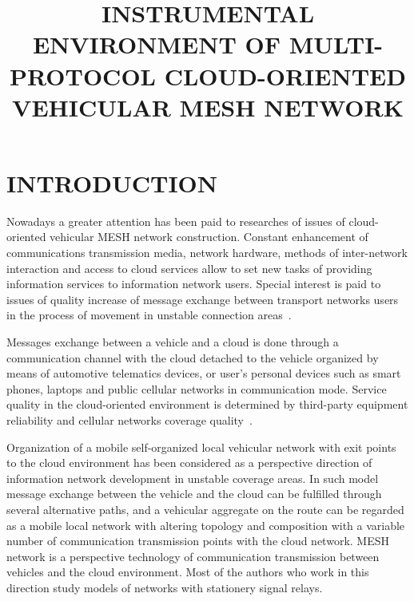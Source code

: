 \documentclass[a4paper,twoside]{article}
\begin{document}
\title{INSTRUMENTAL ENVIRONMENT OF MULTI-PROTOCOL CLOUD-ORIENTED VEHICULAR MESH NETWORK}

\author{  
}



\onecolumn \maketitle \normalsize \vfill

\section{INTRODUCTION}

Nowadays a greater attention has been paid to researches of issues of cloud-oriented vehicular MESH network construction. Constant enhancement of communications transmission media, network hardware, methods of inter-network interaction and access to cloud services allow to set new tasks of providing information services to information network users. Special interest is paid to issues of quality increase of message exchange between transport networks users in the process of movement in unstable connection areas~\cite{Zaborovsky}.

Messages exchange between a vehicle and a cloud is done through a communication channel with the cloud detached to the vehicle organized by means of automotive telematics devices, or user's personal devices such as smart phones, laptops and public cellular networks in communication mode. Service quality in the cloud-oriented environment is determined by third-party equipment reliability and cellular networks coverage quality~\cite{6083854}.

Organization of a mobile self-organized local vehicular network with exit points to the cloud environment has been considered as a perspective direction of information network development in unstable coverage areas. In such model message exchange between the vehicle and the cloud can be fulfilled through several alternative paths, and a vehicular aggregate on the route can be regarded as a mobile local network with altering topology and composition with a variable number of communication transmission points with the cloud network. MESH network is a perspective technology of communication transmission between vehicles and the cloud environment. Most of the authors who work in this direction study models of networks with stationery signal relays.
\end{document}
